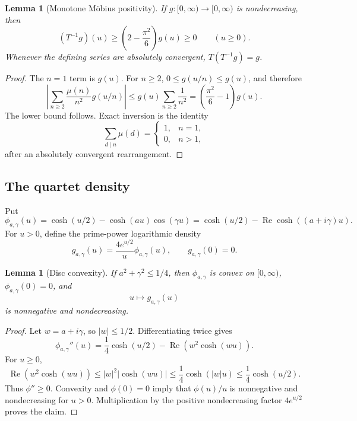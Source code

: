\documentclass[11pt]{article}
\newtheorem{lemma}[theorem]{Lemma}
\newcommand{\re}{\operatorname{Re}}
\begin{document}
\begin{lemma}[Monotone M\"obius positivity]
\label{lem:mobius}
If \(g:[0,\infty)\to[0,\infty)\) is nondecreasing, then
\[
 (T^{-1}g)(u)
 \geq\left(2-\frac{\pi^2}{6}\right)g(u)\geq0
 \qquad (u\geq0).
\]
Whenever the defining series are absolutely convergent,
\(T(T^{-1}g)=g\).
\end{lemma}

\begin{proof}
The \(n=1\) term is \(g(u)\).  For \(n\geq2\),
\(0\leq g(u/n)\leq g(u)\), and therefore
\[
 \left|
 \sum_{n\geq2}\frac{\mu(n)}{n^2}g(u/n)
 \right|
 \leq g(u)\sum_{n\geq2}\frac1{n^2}
 =\left(\frac{\pi^2}{6}-1\right)g(u).
\]
The lower bound follows.  Exact inversion is the identity
\[
 \sum_{d\mid n}\mu(d)=
 \begin{cases}
 1,&n=1,\\
 0,&n>1,
 \end{cases}
\]
after an absolutely convergent rearrangement.
\end{proof}

\subsection{The quartet density}

Put
\[
 \phi_{a,\gamma}(u)
 =\cosh(u/2)-\cosh(au)\cos(\gamma u)
 =\cosh(u/2)-\re\cosh((a+i\gamma)u).
\]
For \(u>0\), define the prime-power logarithmic density
\[
 g_{a,\gamma}(u)
 =\frac{4e^{u/2}}{u}\phi_{a,\gamma}(u),
 \qquad
 g_{a,\gamma}(0)=0.
\]

\begin{lemma}[Disc convexity]
\label{lem:convexity}
If \(a^2+\gamma^2\leq1/4\), then
\(\phi_{a,\gamma}\) is convex on \([0,\infty)\),
\(\phi_{a,\gamma}(0)=0\), and
\[
 u\longmapsto g_{a,\gamma}(u)
\]
is nonnegative and nondecreasing.
\end{lemma}

\begin{proof}
Let \(w=a+i\gamma\), so \(|w|\leq1/2\).  Differentiating twice gives
\[
 \phi_{a,\gamma}''(u)
 =\frac14\cosh(u/2)-\re\!\left(w^2\cosh(wu)\right).
\]
For \(u\geq0\),
\[
 \re\!\left(w^2\cosh(wu)\right)
 \leq |w|^2|\cosh(wu)|
 \leq\frac14\cosh(|w|u)
 \leq\frac14\cosh(u/2).
\]
Thus \(\phi''\geq0\).  Convexity and
\(\phi(0)=0\) imply that \(\phi(u)/u\) is nonnegative and nondecreasing
for \(u>0\).  Multiplication by the positive nondecreasing factor
\(4e^{u/2}\) proves the claim.
\end{proof}
\end{document}
